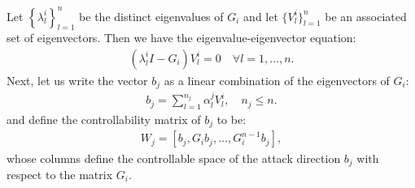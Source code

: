 \documentclass{amsart}
\theoremstyle{definition}
\theoremstyle{remark}
\newtheorem{remark}{Remark}
\numberwithin{equation}{section}
\begin{document}
 

Let $\left \{\lambda_l^i \right\}_{l=1}^n$ be the distinct eigenvalues of $G_i$ and let $\{V_l^i\}_{l=1}^n$ be an associated set of eigenvectors. Then we have the eigenvalue-eigenvector equation:
 \begin{align} \label{eq:eq0}
 \left (\lambda_l^i I - G_i \right ) V_l^i = 0 \quad \forall l = 1, \ldots, n.
 \end{align}
Next, let us write the vector $b_j$ as a linear combination of the eigenvectors of $G_i$:
 \begin{align} \label{eq:fjLinComb}
 b_j = \sum_{l=1}^{n_j} \alpha_l^j V_l^i, \quad n_j \leq n.
 \end{align}
 and define the controllability matrix of $b_j$ to be: 
 \begin{align} \label{eq:wj}
 W_j = \left [b_j, G_i b_j, \ldots, G_i^{n-1}b_j \right],
 \end{align}
whose columns define the controllable space of the attack direction $b_j$ with respect to the matrix $G_i$. 

\end{document}
